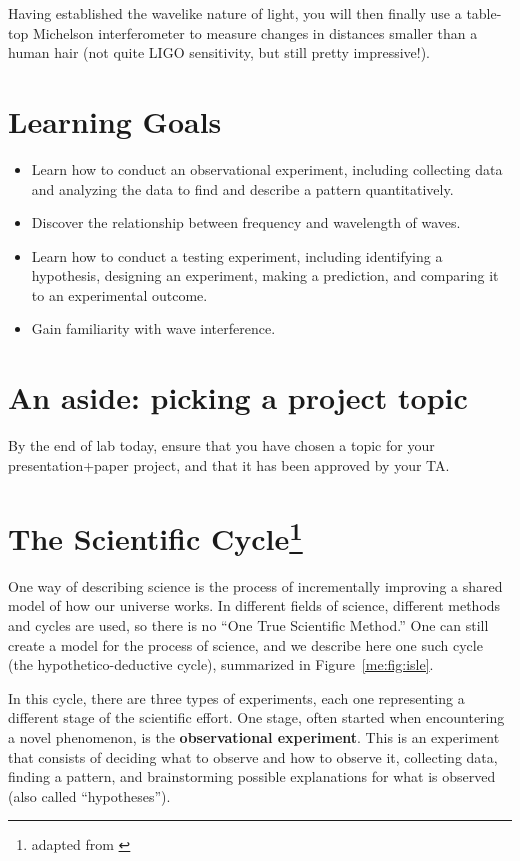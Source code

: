 Having established the wavelike nature of light, you will then finally use a table-top Michelson interferometer to measure changes in distances smaller than a human hair (not quite LIGO sensitivity, but still pretty impressive!).

\section{Learning Goals}

\begin{itemize}
	\item Learn how to conduct an observational experiment, including collecting data and analyzing the data to find and describe a pattern quantitatively.
	
	\item Discover the relationship between frequency and wavelength of waves.
	
	\item Learn how to conduct a testing experiment, including identifying a hypothesis, designing an experiment, making a prediction, and comparing it to an experimental outcome.
	
	\item Gain familiarity with wave interference.
\end{itemize}

\section{An aside: picking a project topic}

By the end of lab today, ensure that you have chosen a topic for your presentation+paper project, and that it has been approved by your TA.

\section{The Scientific Cycle\protect\footnote{adapted from \cite{etkina_college_2014}}}

One way of describing science is the process of incrementally improving a shared model of how our universe works. In different fields of science, different methods and cycles are used, so there is no ``One True Scientific Method.'' One can still create a model for the process of science, and we describe here one such cycle (the hypothetico-deductive cycle), summarized in Figure~\ref{me:fig:isle}.

In this cycle, there are three types of experiments, each one representing a different stage of the scientific effort. One stage, often started when encountering a novel phenomenon, is the \textbf{observational experiment}. This is an experiment that consists of deciding what to observe and how to observe it, collecting data, finding a pattern, and brainstorming possible explanations for what is observed (also called ``hypotheses'').

